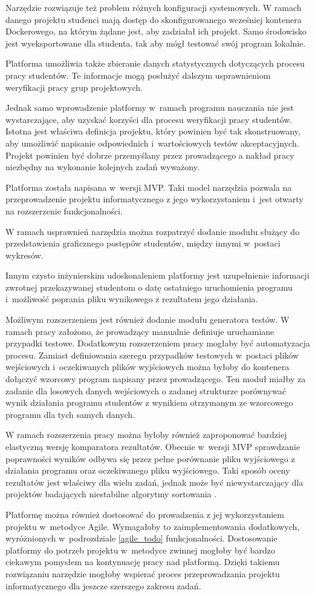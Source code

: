 Narzędzie rozwiązuje też problem różnych konfiguracji systemowych.
W ramach danego projektu studenci mają dostęp do skonfigurowanego wcześniej kontenera Dockerowego, na którym żądane jest, aby zadziałał ich projekt.
Samo środowisko jest wyeksportowane dla studenta, tak aby mógł testować swój program lokalnie.

Platforma umożliwia także zbieranie danych statystycznych dotyczących procesu pracy studentów.
Te informacje mogą posłużyć dalszym usprawnieniom weryfikacji pracy grup projektowych.

Jednak samo wprowadzenie platformy w~ramach programu nauczania nie jest wystarczające, aby uzyskać  korzyści dla procesu weryfikacji pracy studentów.
Istotna jest właściwa definicja projektu, który powinien być tak skonstruowany, aby umożliwić napisanie odpowiednich i~wartościowych testów akceptacyjnych.
Projekt powinien być dobrze przemyślany przez prowadzącego a nakład pracy niezbędny na wykonanie kolejnych zadań wyważony.

Platforma została napisana w~wersji MVP.
Taki model narzędzia pozwala na przeprowadzenie projektu informatycznego z jego wykorzystaniem i~jest otwarty na rozszerzenie funkcjonalności.

W ramach usprawnień narzędzia można rozpatrzyć dodanie modułu służący do przedstawienia graficznego postępów studentów, między innymi w~postaci wykresów.

Innym czysto inżynierskim udoskonaleniem platformy jest uzupełnienie informacji zwrotnej przekazywanej studentom o datę ostatniego uruchomienia programu i~możliwość poprania pliku wynikowego z rezultatem jego działania.

Możliwym rozszerzeniem jest również dodanie modułu generatora testów.
W ramach pracy założono, że prowadzący manualnie definiuje uruchamiane przypadki testowe.
Dodatkowym rozszerzeniem pracy mogłaby być automatyzacja procesu.
Zamiast definiowania szeregu przypadków testowych w~postaci plików wejściowych i~oczekiwanych plików wyjściowych można byłoby do kontenera dołączyć wzorcowy program napisany przez prowadzącego.
Ten moduł miałby za zadanie dla losowych danych wejściowych o zadanej strukturze porównywać wynik działania programu studentów z wynikiem otrzymanym ze wzorcowego programu dla tych samych danych.

W ramach rozszerzenia pracy można byłoby również zaproponować bardziej elastyczną wersję komparatora rezultatów.
Obecnie w~wersji MVP sprawdzanie poprawności wyników odbywa się przez pełne porównanie pliku wyjściowego z działania programu oraz oczekiwanego pliku wyjściowego.
Taki sposób oceny rezultatów jest właściwy dla wielu zadań, jednak może być niewystarczający dla projektów badających niestabilne algorytmy sortowania \cite{sorting}.

Platformę można również dostosować do prowadzenia z jej wykorzystaniem projektu w~metodyce Agile.
Wymagałoby to zaimplementowania dodatkowych, wyróżnionych w~podrozdziale \ref{agile_todo} funkcjonalności.
Dostosowanie platformy do potrzeb projektu w~metodyce zwinnej mogłoby być bardzo ciekawym pomysłem na kontynuację pracy nad platformą.
Dzięki takiemu rozwiązaniu narzędzie mogłoby wspierać proces przeprowadzania projektu informatycznego dla jeszcze szerszego zakresu zadań.